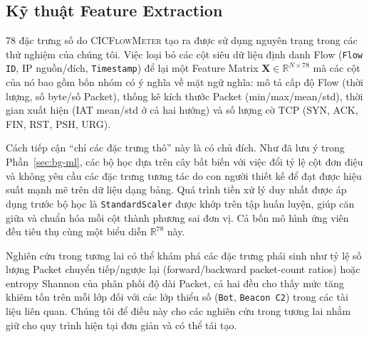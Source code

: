 \subsection{Kỹ thuật Feature Extraction}
\label{sec:feat-eng}

78 đặc trưng số do \textsc{CICFlowMeter} tạo ra được sử dụng nguyên trạng trong các thử nghiệm của chúng tôi. Việc loại bỏ các cột siêu dữ liệu định danh Flow (\texttt{Flow ID}, IP nguồn/đích, \texttt{Timestamp}) để lại một Feature Matrix $\mathbf{X} \in \mathbb{R}^{N \times 78}$ mà các cột của nó bao gồm bốn nhóm có ý nghĩa về mặt ngữ nghĩa: mô tả cấp độ Flow (thời lượng, số byte/số Packet), thống kê kích thước Packet (min/max/mean/std), thời gian xuất hiện (IAT mean/std ở cả hai hướng) và số lượng cờ TCP (SYN, ACK, FIN, RST, PSH, URG).

Cách tiếp cận ``chỉ các đặc trưng thô'' này là có chủ đích. Như đã lưu ý trong Phần~\ref{sec:bg-ml}, các bộ học dựa trên cây bất biến với việc đổi tỷ lệ cột đơn điệu và không yêu cầu các đặc trưng tương tác do con người thiết kế để đạt được hiệu suất mạnh mẽ trên dữ liệu dạng bảng. Quá trình tiền xử lý duy nhất được áp dụng trước bộ học là \texttt{StandardScaler} được khớp trên tập huấn luyện, giúp căn giữa và chuẩn hóa mỗi cột thành phương sai đơn vị. Cả bốn mô hình ứng viên đều tiêu thụ cùng một biểu diễn $\mathbb{R}^{78}$ này.

Nghiên cứu trong tương lai có thể khám phá các đặc trưng phái sinh như tỷ lệ số lượng Packet chuyển tiếp/ngược lại (forward/backward packet-count ratios) hoặc entropy Shannon của phân phối độ dài Packet, cả hai đều cho thấy mức tăng khiêm tốn trên mỗi lớp đối với các lớp thiểu số (\texttt{Bot}, \texttt{Beacon C2}) trong các tài liệu liên quan. Chúng tôi để điều này cho các nghiên cứu trong tương lai nhằm giữ cho quy trình hiện tại đơn giản và có thể tái tạo.
